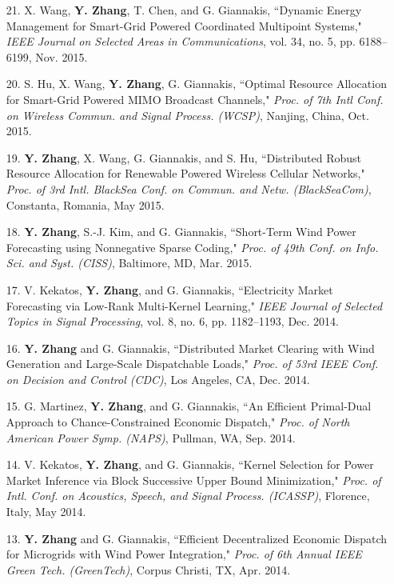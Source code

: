 \documentclass[margin,line]{res}
\begin{document}
\begin{resume}
\begin{enumerate}
\item[21.]	X. Wang, \textbf{Y. Zhang}, T. Chen, and G. Giannakis,
``Dynamic Energy Management for Smart-Grid Powered Coordinated Multipoint Systems,"
\emph{IEEE Journal on Selected Areas in Communications}, vol. 34, no. 5, pp. 6188--6199, Nov. 2015.

\item[20.] S. Hu, X. Wang, \textbf{Y. Zhang}, G. Giannakis,
``Optimal Resource Allocation for Smart-Grid Powered MIMO Broadcast Channels,"
\emph{Proc. of 7th Intl Conf. on Wireless Commun. and Signal Process. (WCSP)}, Nanjing, China, Oct. 2015.

\item[19.]	\textbf{Y. Zhang}, X. Wang, G. Giannakis, and S. Hu,
``Distributed Robust Resource Allocation for Renewable Powered Wireless Cellular Networks,"
\emph{Proc. of 3rd Intl. BlackSea Conf. on Commun. and Netw. (BlackSeaCom)}, Constanta, Romania, May 2015.

\item[18.]	\textbf{Y. Zhang}, S.-J. Kim, and G. Giannakis,
``Short-Term Wind Power Forecasting using Nonnegative Sparse Coding,"
\emph{Proc. of 49th Conf. on Info. Sci. and Syst. (CISS)}, Baltimore, MD, Mar. 2015.


\item[17.] V. Kekatos, \textbf{Y. Zhang}, and G. Giannakis,
``Electricity Market Forecasting via Low-Rank Multi-Kernel Learning,"
\emph{IEEE Journal of Selected Topics in Signal Processing}, vol. 8, no. 6, pp. 1182--1193, Dec. 2014.

\item[16.]	\textbf{Y. Zhang} and G. Giannakis,
``Distributed Market Clearing with Wind Generation and Large-Scale Dispatchable Loads,"
\emph{Proc. of 53rd IEEE Conf. on Decision and Control (CDC)}, Los Angeles, CA, Dec. 2014.

\item[15.] G. Martinez, \textbf{Y. Zhang}, and G. Giannakis,
``An Efficient Primal-Dual Approach to Chance-Constrained Economic Dispatch,"
\emph{Proc. of North American Power Symp. (NAPS)}, Pullman, WA, Sep. 2014.

\item[14.]	V. Kekatos, \textbf{Y. Zhang}, and G. Giannakis,
``Kernel Selection for Power Market Inference via Block Successive Upper Bound Minimization,"
\emph{Proc. of Intl. Conf. on Acoustics, Speech, and Signal Process. (ICASSP)},
Florence, Italy, May 2014.

\item[13.]	\textbf{Y. Zhang} and G. Giannakis,
``Efficient Decentralized Economic Dispatch for Microgrids with Wind Power Integration,"
\emph{Proc. of 6th Annual IEEE Green Tech. (GreenTech)}, Corpus Christi, TX, Apr. 2014.



\end{enumerate}
\end{resume}
\end{document}

